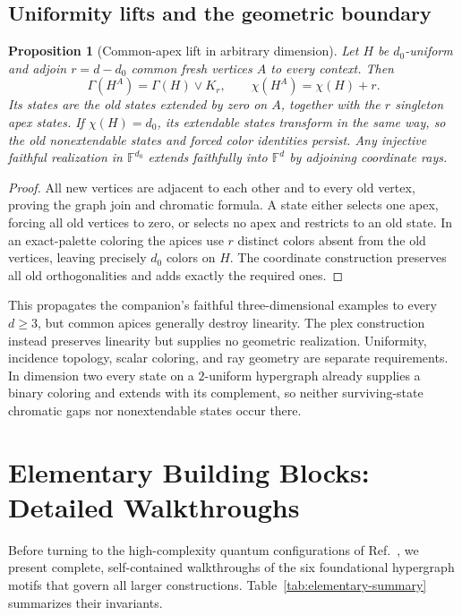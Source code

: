 \documentclass[aps,pra,reprint,superscriptaddress,longbibliography,nofootinbib,floatfix,10pt]{revtex4-2}
\newtheorem{proposition}[theorem]{Proposition}
\theoremstyle{definition}\newtheorem{definition}[theorem]{Definition}
\theoremstyle{remark}\newtheorem{remark}[theorem]{Remark}
\newcommand{\F}{\mathbb F}\newcommand{\Z}{\mathbb Z}\newcommand{\PP}{\mathbb P}
\begin{document}
\subsection{Uniformity lifts and the geometric boundary}\label{sec:general-lifts}

\begin{proposition}[Common-apex lift in arbitrary dimension]\label{prop:general-apex}
Let $H$ be $d_0$-uniform and adjoin $r=d-d_0$ common fresh vertices $A$ to every context. Then
\[
\Gamma(H^A)=\Gamma(H)\vee K_r,\qquad\chi(H^A)=\chi(H)+r.
\]
Its states are the old states extended by zero on $A$, together with the $r$ singleton apex states. If $\chi(H)=d_0$, its extendable states transform in the same way, so the old nonextendable states and forced color identities persist. Any injective faithful realization in $\F^{d_0}$ extends faithfully into $\F^d$ by adjoining coordinate rays.
\end{proposition}
\begin{proof}
All new vertices are adjacent to each other and to every old vertex, proving the graph join and chromatic formula. A state either selects one apex, forcing all old vertices to zero, or selects no apex and restricts to an old state. In an exact-palette coloring the apices use $r$ distinct colors absent from the old vertices, leaving precisely $d_0$ colors on $H$. The coordinate construction preserves all old orthogonalities and adds exactly the required ones.
\end{proof}

This propagates the companion's faithful three-dimensional examples to every $d\ge3$, but common apices generally destroy linearity. The plex construction instead preserves linearity but supplies no geometric realization. Uniformity, incidence topology, scalar coloring, and ray geometry are separate requirements. In dimension two every state on a $2$-uniform hypergraph already supplies a binary coloring and extends with its complement, so neither surviving-state chromatic gaps nor nonextendable states occur there.


\section{Elementary Building Blocks: Detailed Walkthroughs}\label{sec:elementary}

Before turning to the high-complexity quantum configurations of Ref.~\cite{svozil2026contexts}, we present complete, self-contained walkthroughs of the six foundational hypergraph motifs that govern all larger constructions. Table~\ref{tab:elementary-summary} summarizes their invariants.
\end{document}
